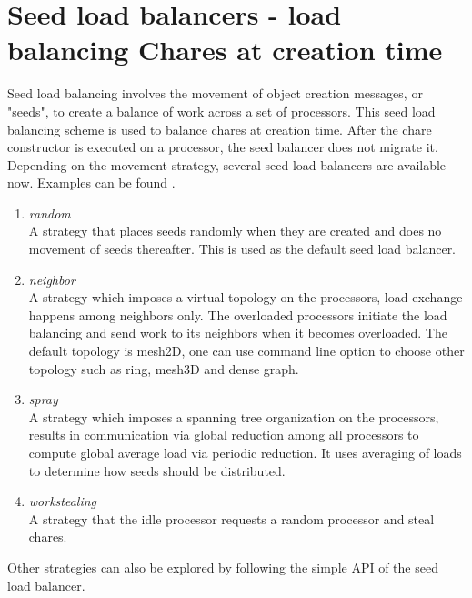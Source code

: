 \section{Seed load balancers - load balancing Chares at creation time}
\label{seedlb}

Seed load balancing involves the movement of object creation messages, or
"seeds", to create a balance of work across a set of processors. 
This seed load balancing scheme is used to balance chares  at creation time.
After the chare constructor is executed on a processor, the seed balancer does not
migrate it.
Depending on the movement strategy, several seed load balancers are available now.
Examples can be found .
\begin{enumerate}
\item {\em random}\\  
 A strategy that places seeds randomly when they are created and does
no movement of seeds thereafter. This is used as the default seed 
load balancer.
\item {\em neighbor}\\  
 A strategy which imposes a virtual topology on the processors,
 load exchange happens among neighbors only. The overloaded processors
 initiate the load balancing and send work to its neighbors
 when it becomes overloaded. The default topology is mesh2D, one can use
 command line option to choose other topology such as ring, mesh3D and 
 dense graph.
\item {\em spray}\\  
 A strategy which imposes a spanning tree organization on the processors,
 results in communication via global reduction among all processors 
 to compute global average load via periodic reduction. 
 It uses averaging of loads to determine how seeds should be
distributed.
\item  {\em workstealing} \\
 A strategy that the idle processor requests a random processor and steal 
 chares.
\end{enumerate}

Other strategies can also be explored by following the simple API of the 
seed load balancer.
\linebreak

